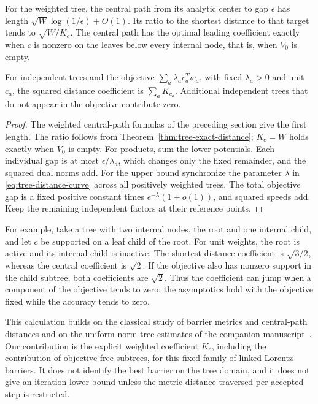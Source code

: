 \begin{corollary}
\label{cor:tree-central-excess}
For the weighted tree, the central path from its analytic center to
gap $\epsilon$ has length
$\sqrt W\log(1/\epsilon)+O(1)$.  Its ratio to the shortest distance
to that target tends to $\sqrt{W/K_c}$.  The central path has the optimal
leading coefficient exactly when $c$ is nonzero on the leaves below every
internal node, that is, when $V_0$ is empty.

For independent trees and the objective
$\sum_a\lambda_a c_a^Tw_a$, with fixed $\lambda_a>0$ and unit $c_a$,
the squared distance coefficient is $\sum_a K_{c_a}$.
Additional independent trees that do not appear in the objective
contribute zero.
\end{corollary}
\begin{proof}
The weighted central-path formulas of the preceding section give the first
length.  The ratio follows from Theorem~\ref{thm:tree-exact-distance};
$K_c=W$ holds exactly when $V_0$ is empty.
For products, sum the lower potentials.  Each individual gap is at most
$\epsilon/\lambda_a$, which changes only the fixed remainder, and the
squared dual norms add.  For the upper bound synchronize the parameter
$\lambda$ in \eqref{eq:tree-distance-curve} across all positively
weighted trees.  The total objective gap is a fixed positive constant
times $e^{-\lambda}(1+o(1))$, and squared speeds add.  Keep the remaining
independent factors at their reference points.
\end{proof}

For example, take a tree with two internal nodes, the root and one
internal child, and let $c$ be supported on a leaf child of the root.  For unit weights, the root is active
and its internal child is inactive.  The shortest-distance coefficient
is $\sqrt{3/2}$, whereas the central coefficient is $\sqrt2$.
If the objective also has nonzero support in the child subtree, both
coefficients are $\sqrt2$.  Thus the coefficient can jump when a
component of the objective tends to zero; the asymptotics hold with the
objective fixed while the accuracy tends to zero.

This calculation builds on the classical study of barrier metrics and
central-path distances \citep{NT2002,NesterovNemirovski2008} and on the
uniform norm-tree estimates of the companion manuscript~\cite{CentralPathCompanion}.  Our
contribution is the explicit weighted coefficient $K_c$, including the
contribution of objective-free subtrees, for this fixed family of linked
Lorentz barriers.  It does not identify the best barrier on the tree
domain, and it does not give an iteration lower bound unless the metric
distance traversed per accepted step is restricted.
